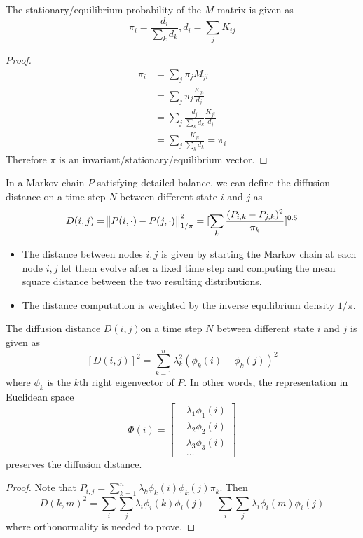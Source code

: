 \begin{refsection}
\begin{lemma}
The stationary/equilibrium probability of the $M$ matrix is given as
$$\pi_i = \frac{d_i}{\sum_k d_k}, d_i = \sum_{j}K_{ij}$$
\end{lemma}
\begin{proof}
\begin{align*}
\pi_i &= \sum_{j}\pi_jM_{ji} \\
&= \sum_{j}\pi_j\frac{K_{ji}}{d_j} \\
& = \sum_{j} \frac{d_j}{\sum_k d_k}\frac{K_{ji}}{d_j}\\
& = \sum_{j} \frac{K_{ji}}{\sum_k d_k} = \pi_i
\end{align*}
Therefore $\pi$ is an invariant/stationary/equilibrium vector.
\end{proof}


\begin{definition}
In a Markov chain $P$ satisfying detailed balance, we can define the diffusion distance on a time step $N$ between different state $i$ and $j$ as
$$D(i,j) = \norm{P(i,\cdot) - P(j,\cdot)}^2_{1/\pi} = [\sum_k \frac{(P_{i,k} - P_{j,k})^2}{\pi_k}]^{0.5}$$
\end{definition}

\begin{remark}[interpretation]\hfill
	\begin{itemize}
		\item The distance between nodes $i,j$ is given by starting the Markov chain at each node $i,j$ let them evolve after a fixed time step and computing the mean square distance between the two resulting distributions.
		\item The distance computation is weighted by the inverse equilibrium density $1/\pi$. 
	\end{itemize}
\end{remark}

\begin{lemma}\cite{de2008introduction}\cite{Holmes-Cerfon2015applied}
The diffusion distance $D(i,j)$on a time step $N$ between different state $i$ and $j$ is given as
$$[D(i,j)]^2 = \sum_{k=1}^n \lambda_k^{2} (\phi_k(i) - \phi_k(j))^2$$
where $\phi_k$ is the $k$th right eigenvector of $P$. 
In other words, the representation in Euclidean space
 $$\Phi(i) = \begin{bmatrix}
 &\lambda_1 \phi_1(i)\\ 
 &\lambda_2 \phi_2(i)\\
 &\lambda_3 \phi_3(i)\\
 &\dots
 \end{bmatrix}$$
preserves the diffusion distance.
\end{lemma}
\begin{proof}
	Note that $P_{i,j} = \sum_{k=1}^n \lambda_k \phi_k(i)\phi_k(j)\pi_k$.
	Then $$D(k,m)^2 = \sum_i\sum_j \lambda_i \phi_i(k)\phi_i(j) - \sum_i\sum_j \lambda_i \phi_i(m)\phi_i(j)$$
	where orthonormality is needed to prove.
\end{proof}



\end{refsection}
